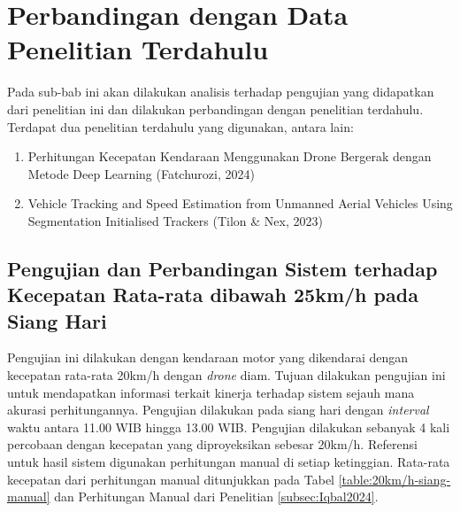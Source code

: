 \section{Perbandingan dengan Data Penelitian Terdahulu}
Pada sub-bab ini akan dilakukan analisis terhadap pengujian yang didapatkan dari penelitian ini dan dilakukan perbandingan dengan penelitian terdahulu. Terdapat dua penelitian terdahulu yang digunakan, antara lain:
\begin{enumerate}[nosep]
  \item Perhitungan Kecepatan Kendaraan Menggunakan Drone Bergerak dengan Metode Deep Learning (Fatchurozi, 2024) \\
  \item Vehicle Tracking and Speed Estimation from Unmanned Aerial Vehicles Using Segmentation Initialised Trackers (Tilon \& Nex, 2023) \\
\end{enumerate}


\subsection{Pengujian dan Perbandingan Sistem terhadap Kecepatan Rata-rata dibawah 25km/h pada Siang Hari}
Pengujian ini dilakukan dengan kendaraan motor yang dikendarai dengan kecepatan rata-rata 20km/h dengan \emph{drone} diam. Tujuan dilakukan pengujian ini untuk mendapatkan informasi terkait kinerja terhadap sistem sejauh mana akurasi perhitungannya. Pengujian dilakukan pada siang hari dengan \emph{interval} waktu antara 11.00 WIB hingga 13.00 WIB. Pengujian dilakukan sebanyak 4 kali percobaan dengan kecepatan yang diproyeksikan sebesar 20km/h. Referensi untuk hasil sistem digunakan perhitungan manual di setiap ketinggian. Rata-rata kecepatan dari perhitungan manual ditunjukkan pada Tabel \ref{table:20km/h-siang-manual} dan Perhitungan Manual dari Penelitian \ref{subsec:Iqbal2024}. 

